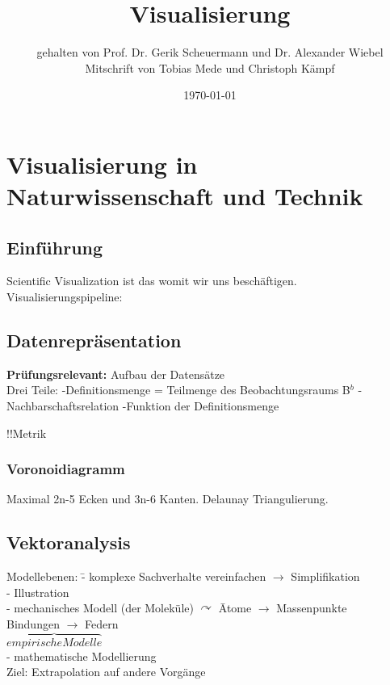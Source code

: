 \documentclass[12pt,a4paper,oneside,normalheadings,abstracton,liststotoc,bibtotoc,titlepage,pdftex]{scrartcl}
\begin{document}

\titlehead{Universität Leipzig\\Fakultät für Fakultät für Mathematik und Informatik}
\subject{Vorlesungsmitschrift SoSe 11}
\title{Visualisierung}
\author{gehalten von Prof. Dr. Gerik Scheuermann und Dr. Alexander Wiebel\\
Mitschrift von Tobias Mede und Christoph Kämpf}
\date{\today}

\maketitle[1]

\begin{abstract}

\end{abstract}

\tableofcontents
\pagebreak


\chapter{Visualisierung in Naturwissenschaft und Technik}

\section{Einführung}
Scientific Visualization ist das womit wir uns beschäftigen.
Visualisierungspipeline:


\section{Datenrepräsentation}
\textbf{Prüfungsrelevant:} Aufbau der Datensätze\\
Drei Teile:
-Definitionsmenge = Teilmenge des Beobachtungsraums B$^b$
-Nachbarschaftsrelation
-Funktion der Definitionsmenge

!!Metrik
\subsection{Voronoidiagramm}
Maximal 2n-5 Ecken und 3n-6 Kanten. Delaunay Triangulierung.

\section{Vektoranalysis}


\begin{tabbing}
Modellebenen: \= - komplexe Sachverhalte vereinfachen $\rightarrow$ Simplifikation \\
\> - Illustration \\
\> - mechanisches Modell (der Moleküle) $\curvearrowright$ \= Atome $\rightarrow$ Massenpunkte \\
\> \> Bindungen $\rightarrow$ Federn \\
\> $\overbrace{empirischeModelle}$ \\
\> - mathematische Modellierung \\
\> Ziel: Extrapolation auf andere Vorgänge \\
\end{tabbing}
\end{document}
